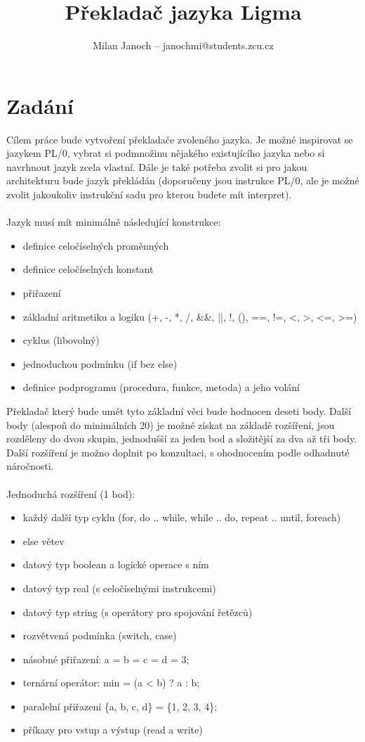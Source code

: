 \documentclass[czech, oth, kiv, he, iso690numb, viewonly]{fasthesis}
\title{Překladač jazyka Ligma}
\author{Milan Janoch – janochmi@students.zcu.cz}{\\Jakub Pavlíček – jpvlck@students.zcu.cz}{Bc.}{}
\begin{document}
\frontpages[tm]
\tableofcontents

    \chapter{Zadání}

    Cílem práce bude vytvoření překladače zvoleného jazyka. Je možné inspirovat se jazykem PL/0, vybrat si podmnožinu nějakého existujícího jazyka nebo si navrhnout jazyk zcela vlastní. Dále je také potřeba zvolit si pro jakou architekturu bude jazyk překládán (doporučeny jsou instrukce PL/0, ale je možné zvolit jakoukoliv instrukční sadu pro kterou budete mít interpret).
    \\\\
    Jazyk musí mít minimálně následující konstrukce:
    \begin{itemize}
        \item definice celočíselných proměnných
        \item definice celočíselných konstant
        \item přiřazení
        \item základní aritmetiku a logiku (+, -, *, /, \&\&, ||, !, (), ==, !=, <, >, <=, >=)
        \item cyklus (libovolný)
        \item jednoduchou podmínku (if bez else)
        \item definice podprogramu (procedura, funkce, metoda) a jeho volání
    \end{itemize}
    Překladač který bude umět tyto základní věci bude hodnocen deseti body. Další body (alespoň do minimálních 20) je možné získat na základě rozšíření, jsou rozděleny do dvou skupin, jednodušší za jeden bod a složitější za dva až tři body. Další rozšíření je možno doplnit po konzultaci, s ohodnocením podle odhadnuté náročnosti.
    \\\\
    Jednoduchá rozšíření (1 bod):
    \begin{itemize}
        \item každý další typ cyklu (for, do .. while, while .. do, repeat .. until, foreach)
        \item else větev
        \item datový typ boolean a logické operace s ním
        \item datový typ real (s celočíselnými instrukcemi)
        \item datový typ string (s operátory pro spojování řetězců)
        \item rozvětvená podmínka (switch, case)
        \item násobné přiřazení: a = b = c = d = 3;
        \item ternární operátor: min = (a < b) ? a : b;
        \item paralelní přiřazení \{a, b, c, d\} = \{1, 2, 3, 4\};
        \item příkazy pro vstup a výstup (read a write)
    \end{itemize}
\end{document}
